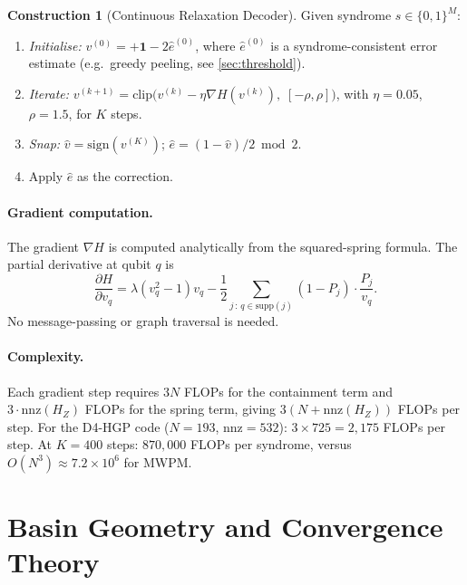 \documentclass[12pt,a4paper]{article}
\theoremstyle{plain}
\theoremstyle{definition}
\newtheorem{construction}[theorem]{Construction}
\theoremstyle{remark}
\newcommand{\HZ}{H_Z}
\begin{document}
\begin{construction}[Continuous Relaxation Decoder]\label{con:decoder}
Given syndrome $s \in \{0,1\}^M$:
\begin{enumerate}[noitemsep]
\item \emph{Initialise:} $v^{(0)} = +\bm{1} - 2\hat{e}^{(0)}$, where $\hat{e}^{(0)}$
  is a syndrome-consistent error estimate (e.g.\ greedy peeling, see \cref{sec:threshold}).
\item \emph{Iterate:}
  $v^{(k+1)} = \mathrm{clip}\bigl(v^{(k)} - \eta \nabla H(v^{(k)}),\;
  [-\rho, \rho]\bigr)$,
  with $\eta=0.05$, $\rho=1.5$, for $K$ steps.
\item \emph{Snap:} $\hat{v} = \mathrm{sign}(v^{(K)})$;
  $\hat{e} = (1-\hat{v})/2 \bmod 2$.
\item Apply $\hat{e}$ as the correction.
\end{enumerate}
\end{construction}

\paragraph{Gradient computation.}
The gradient $\nabla H$ is computed analytically from the squared-spring
formula.
The partial derivative at qubit $q$ is
\begin{equation}
  \frac{\partial H}{\partial v_q}
  = \lambda(v_q^2-1)v_q - \frac{1}{2}
    \sum_{j\,:\,q\in\mathrm{supp}(j)} (1-P_j)\cdot\frac{P_j}{v_q}.
  \label{eq:grad_formula}
\end{equation}
No message-passing or graph traversal is needed.

\paragraph{Complexity.}
Each gradient step requires $3N$ FLOPs for the containment term and
$3\cdot\mathrm{nnz}(\HZ)$ FLOPs for the spring term, giving
$3(N + \mathrm{nnz}(\HZ))$ FLOPs per step.
For the D4-HGP code ($N=193$, $\mathrm{nnz}=532$):
$3\times 725 = 2{,}175$ FLOPs per step.
At $K=400$ steps: $870{,}000$ FLOPs per syndrome,
versus $O(N^3) \approx 7.2\times10^6$ for MWPM.

\section{Basin Geometry and Convergence Theory}\label{sec:basin}
\end{document}
